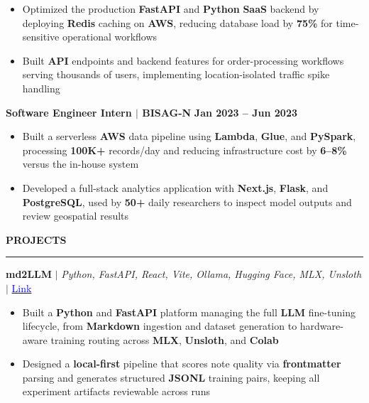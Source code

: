 \documentclass{article}
\begin{document}
{\small
\begin{itemize}[noitemsep, nolistsep, leftmargin=*, itemsep=1mm]
\item Optimized the production \textbf{FastAPI} and \textbf{Python} \textbf{SaaS} backend by deploying \textbf{Redis} caching on \textbf{AWS}, reducing database load by \textbf{75\%} for time-sensitive operational workflows

\item Built \textbf{API} endpoints and backend features for order-processing workflows serving thousands of users, implementing location-isolated traffic spike handling
\end{itemize}
}

\vspace{3mm}

{\large \noindent \textbf{Software Engineer Intern $\mid$ BISAG-N}} \hfill \textbf{Jan 2023 -- Jun 2023}

{\small
\begin{itemize}[noitemsep, nolistsep, leftmargin=*, itemsep=1mm]
\item Built a serverless \textbf{AWS} data pipeline using \textbf{Lambda}, \textbf{Glue}, and \textbf{PySpark}, processing \textbf{100K+} records/day and reducing infrastructure cost by \textbf{6--8\%} versus the in-house system

\item Developed a full-stack analytics application with \textbf{Next.js}, \textbf{Flask}, and \textbf{PostgreSQL}, used by \textbf{50+} daily researchers to inspect model outputs and review geospatial results
\end{itemize}
}

\vspace{3mm}
\noindent \textbf{PROJECTS} \vspace{-8pt} \\
\rule{\linewidth}{0.5pt}

{\large \noindent \textbf{md2LLM} $\mid$ \textit{Python, FastAPI, React, Vite, Ollama, Hugging Face, MLX, Unsloth} $\mid$ \href{https://github.com/aryanpandit/md2llm}{\textcolor{blue}{Link}}}

{\small
\begin{itemize}[noitemsep, nolistsep, leftmargin=*, itemsep=1mm]
\item Built a \textbf{Python} and \textbf{FastAPI} platform managing the full \textbf{LLM} fine-tuning lifecycle, from \textbf{Markdown} ingestion and dataset generation to hardware-aware training routing across \textbf{MLX}, \textbf{Unsloth}, and \textbf{Colab}

\item Designed a \textbf{local-first} pipeline that scores note quality via \textbf{frontmatter} parsing and generates structured \textbf{JSONL} training pairs, keeping all experiment artifacts reviewable across runs
\end{itemize}
}
\end{document}
